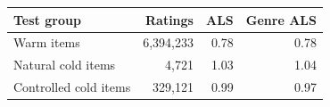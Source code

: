 \begin{tabular*}{\linewidth}{@{\extracolsep{\fill}}lrrr}
\toprule
Test group & Ratings & ALS & Genre ALS \\
\midrule
Warm items & 6,394,233 & 0.78 & 0.78 \\
Natural cold items & 4,721 & 1.03 & 1.04 \\
Controlled cold items & 329,121 & 0.99 & 0.97 \\
\bottomrule
\end{tabular*}
